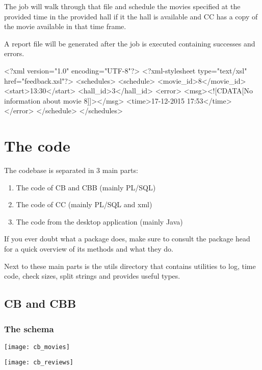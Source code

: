 \documentclass[a4paper]{article}
\begin{document}
The job will walk through that file and schedule the movies specified at the provided time in the provided hall if it the hall is available and CC has a copy of the movie available in that time frame.\par
A report file will be generated after the job is executed containing successes and errors.

\begin{xmlcode}
<?xml version="1.0" encoding="UTF-8"?>
<?xml-stylesheet type="text/xsl" href="feedback.xsl"?>
<schedules>
    <schedule>
        <movie_id>8</movie_id>
        <start>13:30</start>
        <hall_id>3</hall_id>
        <error>
            <msg><![CDATA[No information about movie 8]]></msg>
            <time>17-12-2015 17:53</time>
        </error>
    </schedule>
</schedules>
\end{xmlcode}

\section{The code}

The codebase is separated in 3 main parts:
\begin{enumerate}
	\item The code of CB and CBB (mainly PL/SQL)
	\item The code of CC (mainly PL/SQL and xml)
	\item The code from the desktop application (mainly Java)
\end{enumerate}
If you ever doubt what a package does, make sure to consult the package head for a quick overview of its methods and what they do.\par
Next to these main parts is the utils directory that contains utilities to log, time code, check sizes, split strings and provides useful types.

\subsection{CB and CBB}

\subsubsection{The schema}

\begin{center}
	\texttt{[image: cb\_movies]}
\end{center}

\begin{center}
	\texttt{[image: cb\_reviews]}
\end{center}
\end{document}
